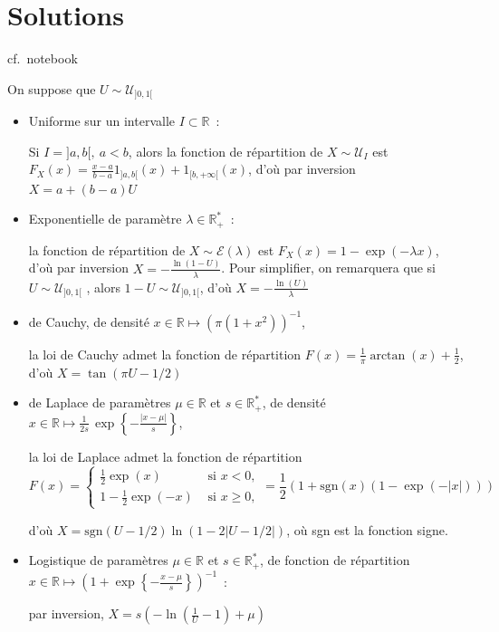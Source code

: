\chapter{Solutions}

\label{V-answer-mc1}
cf.~notebook

\label{V-answer-exemples1}
On suppose que \(U \sim \mathcal{U}_{]0,1[}\)

\begin{itemize}
\item
  Uniforme sur un intervalle \(I \subset \mathbb{R}\)~:

  Si \(I = ]a,b[,~a< b\), alors la fonction de répartition de
  \(X \sim \mathcal{U}_I\) est
  \(F_X(x) = \frac{x-a}{b-a} 1_{]a,b[}(x) + 1_{[b,+\infty[}(x)\), d'où
  par inversion \(X = a + (b-a)U\)
\item
  Exponentielle de paramètre \(\lambda \in \mathbb{R}_+^\ast\)~:

  la fonction de répartition de \(X \sim \mathcal{E}(\lambda)\) est
  \(F_X (x) = 1-\exp(-\lambda x)\), d'où par inversion
  \(X = -\frac{\ln(1-U)}{\lambda}\). Pour simplifier, on remarquera que
  si \(U \sim \mathcal{U}_{]0,1 [ }\) , alors
  \(1- U \sim \mathcal{U}_{]0,1[}\), d'où
  \(X = -\frac{\ln(U)}{\lambda}\)
\item
  de Cauchy, de densité
  \(x\in\mathbb{R}\mapsto \left(\pi\left(1+x^2\right)\right)^{-1}\),

  la loi de Cauchy admet la fonction de répartition
  \(F(x) = \frac{1}{\pi} \arctan (x) + \frac{1}{2}\), d'où
  \(X = \tan(\pi U -1/2)\)
\item
  de Laplace de paramètres \(\mu \in \mathbb{R}\) et
  \(s\in\mathbb{R}_+^\ast\), de densité
  \(x\in\mathbb{R}\mapsto \frac{1}{2s}\,\exp\left\{-\frac{|x-\mu|}{s}\right\}\),

  la loi de Laplace admet la fonction de répartition
  \[F(x) = \left\{ \begin{array}{ll}
    \frac{1}{2} \exp(x) & \text{ si } x < 0,\\
    1 - \frac{1}{2} \exp(-x) & \text{ si } x \geq 0,
    \end{array} \right. = \frac{1}{2}\left(1 + \text{sgn}(x)(1-\exp(-|x|))\right)\]

  d'où \(X = \text{sgn}(U - 1/2)\ln(1-2|U-1/2|)\), où sgn est la
  fonction signe.
\item
  Logistique de paramètres \(\mu \in \mathbb{R}\) et
  \(s\in\mathbb{R}_+^\ast\), de fonction de répartition
  \(x\in\mathbb{R}\mapsto \left(1 + \exp\left\{-\frac{x-\mu}{s} \right\}\right)^{-1}\)~:

  par inversion,
  \(X = s \left(-\ln\left(\frac{1}{U}-1\right)+ \mu\right)\)
\end{itemize}

